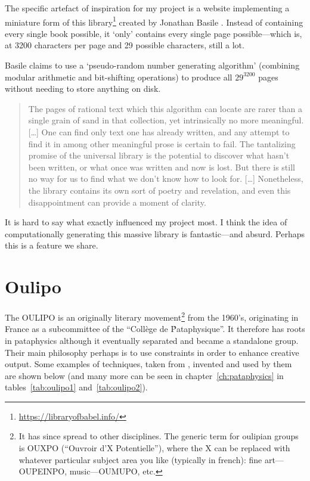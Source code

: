 The specific artefact of inspiration for my project is a website implementing a miniature form of this library\footnote{\url{https://libraryofbabel.info/}} created by Jonathan Basile \autocite*{Basile2015}. Instead of containing every single book possible, it `only' contains every single page possible---which is, at \num{3200} characters per page and \num{29} possible characters, still a lot.

Basile claims to use a `pseudo-random number generating algorithm' (combining modular arithmetic and bit-shifting operations) to produce all $29^{3200}$ pages without needing to store anything on disk.

\begin{quotation}
  The pages of rational text which this algorithm can locate are rarer than a single grain of sand in that collection, yet intrinsically no more meaningful.
  [\ldots]
  One can find only text one has already written, and any attempt to find it in among other meaningful prose is certain to fail. The tantalizing promise of the universal library is the potential to discover what hasn’t been written, or what once was written and now is lost. But there is still no way for us to find what we don’t know how to look for.
  [\ldots]
  Nonetheless, the library contains its own sort of poetry and revelation, and even this disappointment can provide a moment of clarity. 
\end{quotation}

It is hard to say what exactly influenced my project most. I think the idea of computationally generating this massive library is fantastic---and absurd. Perhaps this is a feature we share.


\section{Oulipo}
\label{s:oulipo}

The \ac{OULIPO} is an originally literary movement\footnote{It has since spread to other disciplines. The generic term for oulipian groups is OUXPO (``Ouvroir d'X Potentielle''), where the X can be replaced with whatever particular subject area you like (typically in french): fine art---OUPEINPO, music---OUMUPO, etc.} from the 1960's, originating in France as a subcommittee of the ``Coll\`{e}ge de \'Pataphysique''. It therefore has roots in pataphysics although it eventually separated and became a standalone group. Their main philosophy perhaps is to use constraints in order to enhance creative output. Some examples of techniques, taken from \autocite{Mathews2005}, invented and used by them are shown below (and many more can be seen in chapter~\ref{ch:pataphysics} in tables~\ref{tab:oulipo1} and~\ref{tab:oulipo2}).

